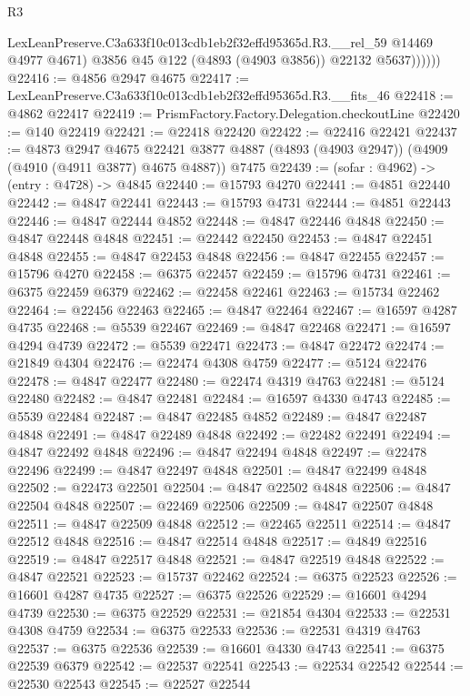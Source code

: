 \begin{lexlean}{R3}
\begin{coremodule}
                LexLeanPreserve.C3a633f10c013cdb1eb2f32effd95365d.R3.__rel_59 @14469 @4977 @4671)
                @3856
                @45
                @122
                (@4893 (@4903 @3856))
                @22132
                @5637))))))
@22416 := @4856 @2947 @4675
@22417 := LexLeanPreserve.C3a633f10c013cdb1eb2f32effd95365d.R3.__fits_46
@22418 := @4862 @22417
@22419 := PrismFactory.Factory.Delegation.checkoutLine
@22420 := @140 @22419
@22421 := @22418 @22420
@22422 := @22416 @22421
@22437 := @4873
    @2947
    @4675
    @22421
    @3877
    @4887
    (@4893 (@4903 @2947))
    (@4909 (@4910 (@4911 @3877) @4675 @4887))
    @7475
@22439 := (sofar : @4962) -> (entry : @4728) -> @4845
@22440 := @15793 @4270
@22441 := @4851 @22440
@22442 := @4847 @22441
@22443 := @15793 @4731
@22444 := @4851 @22443
@22446 := @4847 @22444 @4852
@22448 := @4847 @22446 @4848
@22450 := @4847 @22448 @4848
@22451 := @22442 @22450
@22453 := @4847 @22451 @4848
@22455 := @4847 @22453 @4848
@22456 := @4847 @22455
@22457 := @15796 @4270
@22458 := @6375 @22457
@22459 := @15796 @4731
@22461 := @6375 @22459 @6379
@22462 := @22458 @22461
@22463 := @15734 @22462
@22464 := @22456 @22463
@22465 := @4847 @22464
@22467 := @16597 @4287 @4735
@22468 := @5539 @22467
@22469 := @4847 @22468
@22471 := @16597 @4294 @4739
@22472 := @5539 @22471
@22473 := @4847 @22472
@22474 := @21849 @4304
@22476 := @22474 @4308 @4759
@22477 := @5124 @22476
@22478 := @4847 @22477
@22480 := @22474 @4319 @4763
@22481 := @5124 @22480
@22482 := @4847 @22481
@22484 := @16597 @4330 @4743
@22485 := @5539 @22484
@22487 := @4847 @22485 @4852
@22489 := @4847 @22487 @4848
@22491 := @4847 @22489 @4848
@22492 := @22482 @22491
@22494 := @4847 @22492 @4848
@22496 := @4847 @22494 @4848
@22497 := @22478 @22496
@22499 := @4847 @22497 @4848
@22501 := @4847 @22499 @4848
@22502 := @22473 @22501
@22504 := @4847 @22502 @4848
@22506 := @4847 @22504 @4848
@22507 := @22469 @22506
@22509 := @4847 @22507 @4848
@22511 := @4847 @22509 @4848
@22512 := @22465 @22511
@22514 := @4847 @22512 @4848
@22516 := @4847 @22514 @4848
@22517 := @4849 @22516
@22519 := @4847 @22517 @4848
@22521 := @4847 @22519 @4848
@22522 := @4847 @22521
@22523 := @15737 @22462
@22524 := @6375 @22523
@22526 := @16601 @4287 @4735
@22527 := @6375 @22526
@22529 := @16601 @4294 @4739
@22530 := @6375 @22529
@22531 := @21854 @4304
@22533 := @22531 @4308 @4759
@22534 := @6375 @22533
@22536 := @22531 @4319 @4763
@22537 := @6375 @22536
@22539 := @16601 @4330 @4743
@22541 := @6375 @22539 @6379
@22542 := @22537 @22541
@22543 := @22534 @22542
@22544 := @22530 @22543
@22545 := @22527 @22544

\end{coremodule}
\end{lexlean}
